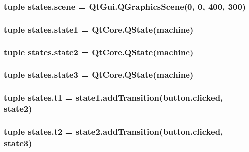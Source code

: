 \subsubsection[{scene}]{\setlength{\rightskip}{0pt plus 5cm}tuple states.\+scene = Qt\+Gui.\+Q\+Graphics\+Scene(0, 0, 400, 300)}\label{namespacestates_a5b980a981bd9d978c035fbbab0e3beed}
\hypertarget{namespacestates_a8210003d0784e45c463be73e1174d89a}{}
\subsubsection[{state1}]{\setlength{\rightskip}{0pt plus 5cm}tuple states.\+state1 = Qt\+Core.\+Q\+State({\bf machine})}\label{namespacestates_a8210003d0784e45c463be73e1174d89a}
\hypertarget{namespacestates_a2f20091b29dcab9a757818992956f2e5}{}
\subsubsection[{state2}]{\setlength{\rightskip}{0pt plus 5cm}tuple states.\+state2 = Qt\+Core.\+Q\+State({\bf machine})}\label{namespacestates_a2f20091b29dcab9a757818992956f2e5}
\hypertarget{namespacestates_af32fad31f58f469eb279d68d90683e60}{}
\subsubsection[{state3}]{\setlength{\rightskip}{0pt plus 5cm}tuple states.\+state3 = Qt\+Core.\+Q\+State({\bf machine})}\label{namespacestates_af32fad31f58f469eb279d68d90683e60}
\hypertarget{namespacestates_a5f7cdd68e40ef59dae4cee25a2e92c5c}{}
\subsubsection[{t1}]{\setlength{\rightskip}{0pt plus 5cm}tuple states.\+t1 = state1.\+add\+Transition(button.\+clicked, {\bf state2})}\label{namespacestates_a5f7cdd68e40ef59dae4cee25a2e92c5c}
\hypertarget{namespacestates_a006db3d3bf69e10a3bebfdfb5b6602b8}{}
\subsubsection[{t2}]{\setlength{\rightskip}{0pt plus 5cm}tuple states.\+t2 = state2.\+add\+Transition(button.\+clicked, {\bf state3})}\label{namespacestates_a006db3d3bf69e10a3bebfdfb5b6602b8}
\hypertarget{namespacestates_ad429a6e4ea7d6eb7bb05fa58f4280596}{}
